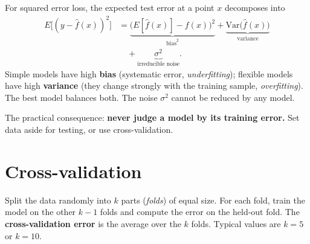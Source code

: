 \documentclass[
  letterpaper,
  DIV=11,
  numbers=noendperiod]{scrreprt}
\begin{document}
\begin{tcolorbox}[enhanced jigsaw, left=2mm, title=\textcolor{quarto-callout-important-color}{\faExclamation}\hspace{0.5em}{Bias--variance decomposition}, opacityback=0, breakable, rightrule=.15mm, arc=.35mm, toptitle=1mm, colbacktitle=quarto-callout-important-color!10!white, opacitybacktitle=0.6, coltitle=black, colframe=quarto-callout-important-color-frame, bottomrule=.15mm, leftrule=.75mm, bottomtitle=1mm, titlerule=0mm, toprule=.15mm, colback=white]

For squared error loss, the expected test error at a point \(x\)
decomposes into
\[\begin{aligned} E\big[(y - \hat f(x))^2\big] &= \underbrace{\big(E[\hat f(x)] - f(x)\big)^2}_{\text{bias}^2} + \underbrace{\text{Var}\big(\hat f(x)\big)}_{\text{variance}} \\ &\quad + \underbrace{\sigma^2}_{\text{irreducible noise}}. \end{aligned}\]
Simple models have high \textbf{bias} (systematic error,
\emph{underfitting}); flexible models have high \textbf{variance} (they
change strongly with the training sample, \emph{overfitting}). The best
model balances both. The noise \(\sigma^2\) cannot be reduced by any
model.

\end{tcolorbox}

The practical consequence: \textbf{never judge a model by its training
error.} Set data aside for testing, or use cross-validation.

\section{Cross-validation}\label{cross-validation}

\begin{tcolorbox}[enhanced jigsaw, left=2mm, title=\textcolor{quarto-callout-note-color}{\faInfo}\hspace{0.5em}{Definition: k-fold cross-validation}, opacityback=0, breakable, rightrule=.15mm, arc=.35mm, toptitle=1mm, colbacktitle=quarto-callout-note-color!10!white, opacitybacktitle=0.6, coltitle=black, colframe=quarto-callout-note-color-frame, bottomrule=.15mm, leftrule=.75mm, bottomtitle=1mm, titlerule=0mm, toprule=.15mm, colback=white]

Split the data randomly into \(k\) parts (\emph{folds}) of equal size.
For each fold, train the model on the other \(k-1\) folds and compute
the error on the held-out fold. The \textbf{cross-validation error} is
the average over the \(k\) folds. Typical values are \(k = 5\) or
\(k = 10\).

\end{tcolorbox}
\end{document}
